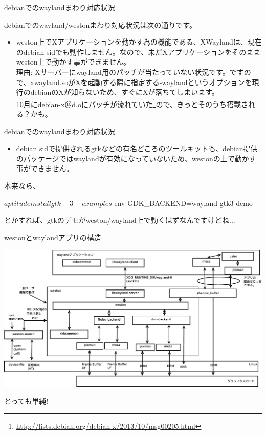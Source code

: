 \begin{frame}{debianでのwaylandまわり対応状況}

debianでのwayland/westonまわり対応状況は次の通りです。

\begin{itemize}
\item weston上でXアプリケーションを動かす為の機能である、XWaylandは、現在のdebian sidでも動作しません。なので、未だXアプリケーションをそのままweston上で動かす事ができません。\\
理由: Xサーバーにwayland用のパッチが当たっていない状況です。ですので、xwayland.soがXを起動する際に指定する-waylandというオプションを現行のdebianのXが知らないため、すぐにXが落ちてしまいます。\\
10月にdebian-x＠d.oにパッチが流れていた\footnote{\url{http://lists.debian.org/debian-x/2013/10/msg00205.html}}ので、きっとそのうち搭載される？かも。
\end{itemize}

\end{frame}

\begin{frame}[containsverbatim]{debianでのwaylandまわり対応状況}

\begin{itemize}
\item debian sidで提供されるgtkなどの有名どころのツールキットも、debian提供のパッケージではwaylandが有効になっていないため、westonの上で動かす事ができません。
\end{itemize}

本来なら、
\begin{commandline}
$ aptitude install gtk-3-examples
$ env GDK_BACKEND=wayland gtk3-demo
\end{commandline}
とかすれば、gtkのデモがweston/wayland上で動くはずなんですけどね...

\end{frame}

\begin{frame}{westonとwaylandアプリの構造}

\begin{center}
\includegraphics[width=0.95\hsize]{image201311/wayland-internal-schema.eps}
\end{center}

\begin{center}
とっても単純!
\end{center}

\end{frame}

